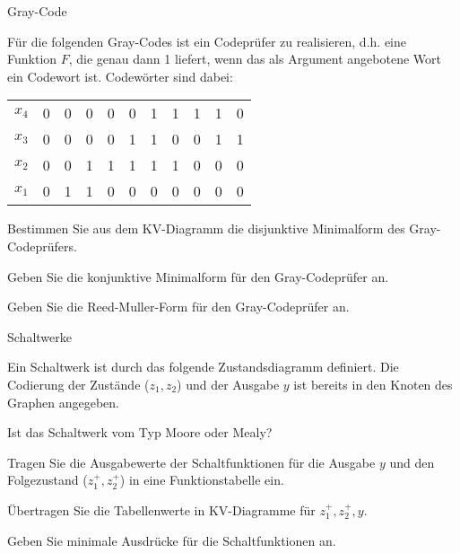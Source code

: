 \documentclass{exercisesheet}
\begin{document}
\begin{exercise*}{Gray-Code}{
    Für die folgenden Gray-Codes ist ein Codeprüfer zu realisieren, d.h. eine Funktion $F$, die genau dann 1 liefert, wenn das als Argument angebotene Wort ein Codewort ist. Codewörter sind dabei:
    \centering\begin{tabular}{c|cccc cccc cc}
      $x_4$ & 0 & 0 & 0 & 0 & 0 & 1 & 1 & 1 & 1 & 0 \\
      $x_3$ & 0 & 0 & 0 & 0 & 1 & 1 & 0 & 0 & 1 & 1 \\
      $x_2$ & 0 & 0 & 1 & 1 & 1 & 1 & 1 & 0 & 0 & 0 \\
      $x_1$ & 0 & 1 & 1 & 0 & 0 & 0 & 0 & 0 & 0 & 0 \\
    \end{tabular}
  }
  \item Bestimmen Sie aus dem KV-Diagramm die disjunktive Minimalform des Gray-Codeprüfers.
  \item Geben Sie die konjunktive Minimalform für den Gray-Codeprüfer an.
  \item Geben Sie die Reed-Muller-Form für den Gray-Codeprüfer an.\par
\end{exercise*}

\begin{exercise*}[10]{Schaltwerke}{
    Ein Schaltwerk ist durch das folgende Zustandsdiagramm definiert. Die Codierung der Zustände ($z_1, z_2$) und der Ausgabe $y$ ist bereits in den Knoten des Graphen angegeben.\par
    \centering
  }
  \item Ist das Schaltwerk vom Typ Moore oder Mealy?
  \item Tragen Sie die Ausgabewerte der Schaltfunktionen für die Ausgabe $y$ und den Folgezustand ($z_1^+, z_2^+$) in eine Funktionstabelle ein.
  \item Übertragen Sie die Tabellenwerte in KV-Diagramme für $z_1^+, z_2^+, y$.
  \item Geben Sie minimale Ausdrücke für die Schaltfunktionen an.
\end{exercise*}
\end{document}
